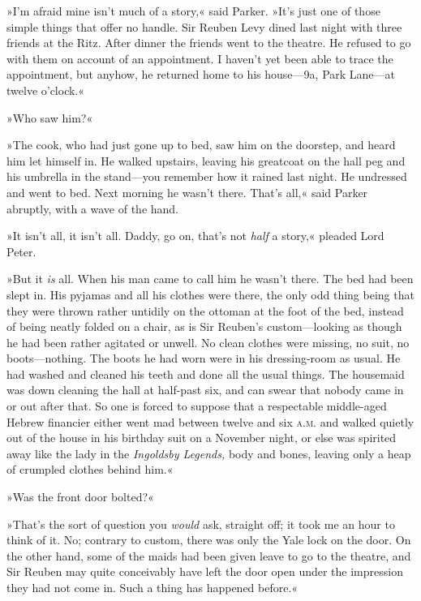 »I'm afraid mine isn't much of a story,« said Parker. »It's just one of those simple things that offer no handle. Sir Reuben Levy dined last night with three friends at the Ritz. After dinner the friends went to the theatre. He refused to go with them on account of an appointment. I haven't yet been able to trace the appointment, but anyhow, he returned home to his house\allowbreak---\allowbreak 9a, Park Lane\allowbreak---\allowbreak at twelve o'clock.«

»Who saw him?«

»The cook, who had just gone up to bed, saw him on the doorstep, and heard him let himself in. He walked upstairs, leaving his greatcoat on the hall peg and his umbrella in the stand\allowbreak---\allowbreak you remember how it rained last night. He undressed and went to bed. Next morning he wasn't there. That's all,« said Parker abruptly, with a wave of the hand.

»It isn't all, it isn't all. Daddy, go on, that's not \textit{half} a story,« pleaded Lord Peter.

»But it \textit{is} all. When his man came to call him he wasn't there. The bed had been slept in. His pyjamas and all his clothes were there, the only odd thing being that they were thrown rather untidily on the ottoman at the foot of the bed, instead of being neatly folded on a chair, as is Sir Reuben's custom\allowbreak---\allowbreak looking as though he had been rather agitated or unwell. No clean clothes were missing, no suit, no boots\allowbreak---\allowbreak nothing. The boots he had worn were in his dressing-room as usual. He had washed and cleaned his teeth and done all the usual things. The housemaid was down cleaning the hall at half-past six, and can swear that nobody came in or out after that. So one is forced to suppose that a respectable middle-aged Hebrew financier either went mad between twelve and six \textsc{a.m.} and walked quietly out of the house in his birthday suit on a November night, or else was spirited away like the lady in the \textit{Ingoldsby Legends,} body and bones, leaving only a heap of crumpled clothes behind him.«

»Was the front door bolted?«

»That's the sort of question you \textit{would} ask, straight off; it took me an hour to think of it. No; contrary to custom, there was only the Yale lock on the door. On the other hand, some of the maids had been given leave to go to the theatre, and Sir Reuben may quite conceivably have left the door open under the impression they had not come in. Such a thing has happened before.«

